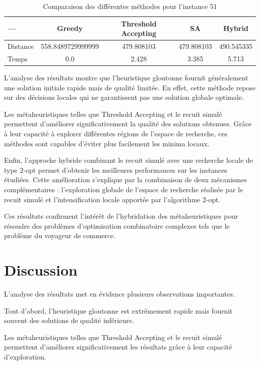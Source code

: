 \documentclass[11pt,a4paper]{article}
\begin{document}
	\begin{table}[h]
		\centering
		\begin{tabular}{lcccc}
			\toprule
			--- & Greedy & Threshold Accepting & SA & Hybrid \\
			\midrule
			Distance & 558.8489729999999 & 479.808103 & 479.808103 & 490.545335 \\
			Temps & 0.0 & 2.428 & 3.385 & 5.713 \\
			
			\bottomrule
		\end{tabular}
		\caption{Comparaison des différentes méthodes pour l'instance 51}
	\end{table}
	L’analyse des résultats montre que l’heuristique gloutonne fournit généralement une solution initiale rapide mais de qualité limitée. En effet, cette méthode repose sur des décisions locales qui ne garantissent pas une solution globale optimale.
	
	Les métaheuristiques telles que Threshold Accepting et le recuit simulé permettent d’améliorer significativement la qualité des solutions obtenues. Grâce à leur capacité à explorer différentes régions de l’espace de recherche, ces méthodes sont capables d’éviter plus facilement les minima locaux.
	
	Enfin, l’approche hybride combinant le recuit simulé avec une recherche locale de type 2-opt permet d’obtenir les meilleures performances sur les instances étudiées. Cette amélioration s’explique par la combinaison de deux mécanismes complémentaires : l’exploration globale de l’espace de recherche réalisée par le recuit simulé et l’intensification locale apportée par l’algorithme 2-opt.
	
	Ces résultats confirment l’intérêt de l’hybridation des métaheuristiques pour résoudre des problèmes d’optimisation combinatoire complexes tels que le problème du voyageur de commerce.
	
	
	\section{Discussion}
	
	L'analyse des résultats met en évidence plusieurs observations importantes.
	
	Tout d'abord, l'heuristique gloutonne est extrêmement rapide mais fournit souvent des solutions de qualité inférieure.
	
	Les métaheuristiques telles que Threshold Accepting et le recuit simulé permettent d'améliorer significativement les résultats grâce à leur capacité d'exploration.
	
\end{document}
